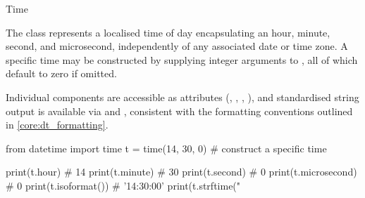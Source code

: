 \documentclass[10pt]{article}
\begin{document}
    \begin{core}{Time}

      The  class represents a localised time of day encapsulating an hour, minute, second, and microsecond, independently of any associated date or time zone. A specific time may be constructed by supplying integer arguments to , all of which default to zero if omitted. 

      Individual components are accessible as attributes (, , , ), and standardised string output is available via  and , consistent with the formatting conventions outlined in \autoref{core:dt_formatting}.

      \begin{pyconsole}

        from datetime import time
        t = time(14, 30, 0)             # construct a specific time

        print(t.hour)                   # 14
        print(t.minute)                 # 30
        print(t.second)                 # 0
        print(t.microsecond)            # 0
        print(t.isoformat())            # '14:30:00'
        print(t.strftime("%

      \end{pyconsole}

    \end{core}
\end{document}
